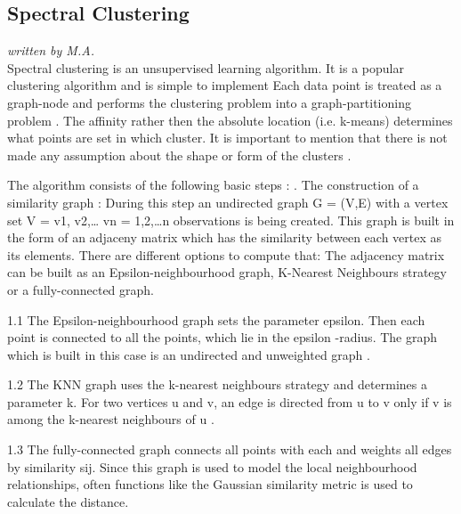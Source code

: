 \subsection{Spectral Clustering}
\textit{written by M.A.}\\

Spectral clustering is an unsupervised learning algorithm. It is a popular clustering algorithm and is simple to implement \cite{von2007tutorial} Each data point is treated as a graph-node and performs the clustering problem into a graph-partitioning problem \cite{spectral-website}. The affinity rather then the absolute location (i.e. k-means) determines what points are set in which cluster. It is important to mention that there is not made any assumption about the shape or form of the clusters \cite{spectral-website}. \newline

The algorithm consists of the following basic steps \cite{von2007tutorial,spectral-website}: .	The construction of a similarity graph : \newline
During this step an undirected graph G = (V,E) with a vertex set V = {v1, v2,… vn} = 1,2,…n observations is being created. This graph is built in the form of an adjaceny matrix which has the similarity between each vertex as its elements. 
There are different options to compute that: The adjacency matrix can be built as an Epsilon-neighbourhood graph, K-Nearest Neighbours strategy or a fully-connected graph. \newline

1.1	The Epsilon-neighbourhood graph sets the parameter epsilon. Then each point is connected to all the points, which lie in the epsilon -radius. The graph which is built in this case is an undirected and unweighted graph \cite{von2007tutorial}. \newline

1.2	The KNN graph uses the k-nearest neighbours strategy  and determines a parameter k. For two vertices u and v, an edge is directed from u to v only if v is among the k-nearest neighbours of u \cite{von2007tutorial}.  \newline

1.3	The fully-connected graph connects all points with each and weights all edges by similarity sij. Since this graph is used to model the local neighbourhood relationships, often functions like the Gaussian similarity metric is used to calculate the distance. \newline


